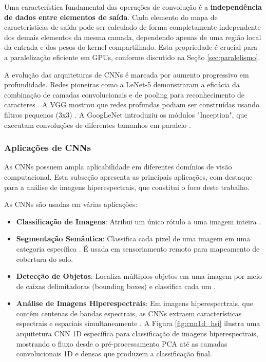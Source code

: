 Uma característica fundamental das operações de convolução é a \textbf{independência de dados entre elementos de saída}. Cada elemento do mapa de características de saída pode ser calculado de forma completamente independente dos demais elementos da mesma camada, dependendo apenas de uma região local da entrada e dos pesos do kernel compartilhado. Esta propriedade é crucial para a paralelização eficiente em GPUs, conforme discutido na Seção \ref{sec:paralelismo}.

A evolução das arquiteturas de CNNs é marcada por aumento progressivo em profundidade. Redes pioneiras como a LeNet-5 demonstraram a eficácia da combinação de camadas convolucionais e de pooling para reconhecimento de caracteres \cite{Gradient-basedlearningappliedtodocumentrecognition}. A VGG mostrou que redes profundas podiam ser construídas usando filtros pequenos (3x3) \cite{VeryDeepConvolutionalNetworksforLarge-ScaleImageRecognition}. A GoogLeNet introduziu os módulos "Inception", que executam convoluções de diferentes tamanhos em paralelo \cite{szegedy2014goingdeeperconvolutions}.

\subsubsection{Aplicações de CNNs}

As CNNs possuem ampla aplicabilidade em diferentes domínios de visão computacional. Esta subseção apresenta as principais aplicações, com destaque para a análise de imagens hiperespectrais, que constitui o foco deste trabalho.

As CNNs são usadas em várias aplicações:

\begin{itemize}
    \item \textbf{Classificação de Imagens}: Atribui um único rótulo a uma imagem inteira \cite{NIPS2012_c399862d}.

    \item \textbf{Segmentação Semântica}: Classifica cada pixel de uma imagem em uma categoria específica \cite{Farabet6338939}. É usada em sensoriamento remoto para mapeamento de cobertura do solo.

    \item \textbf{Detecção de Objetos}: Localiza múltiplos objetos em uma imagem por meio de caixas delimitadoras (bounding boxes) e classifica cada um \cite{sermanet2014overfeatintegratedrecognitionlocalization}.

    \item \textbf{Análise de Imagens Hiperespectrais}: Em imagens hiperespectrais, que contêm centenas de bandas espectrais, as CNNs extraem características espectrais e espaciais simultaneamente \cite{Li2019DeepLF}. A Figura \ref{fig:cnn1d_hsi} ilustra uma arquitetura CNN 1D específica para classificação de imagens hiperespectrais, mostrando o fluxo desde o pré-processamento PCA até as camadas convolucionais 1D e densas que produzem a classificação final.
\end{itemize}

